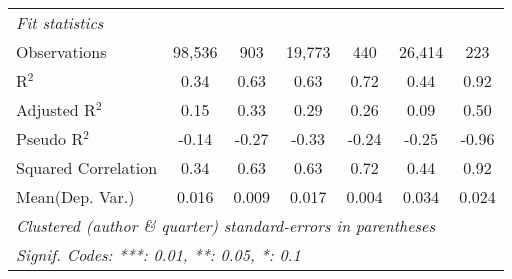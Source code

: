 \begin{tabular}{lcccccc}
   \midrule
   \emph{Fit statistics}\\
   Observations                                               & 98,536       & 903          & 19,773  & 440           & 26,414  & 223\\  
   R$^2$                                                      & 0.34         & 0.63         & 0.63    & 0.72          & 0.44    & 0.92\\  
   Adjusted R$^2$                                             & 0.15         & 0.33         & 0.29    & 0.26          & 0.09    & 0.50\\  
   Pseudo R$^2$                                               & -0.14        & -0.27        & -0.33   & -0.24         & -0.25   & -0.96\\  
   Squared Correlation                                        & 0.34         & 0.63         & 0.63    & 0.72          & 0.44    & 0.92\\  
Mean(Dep. Var.) & 0.016 & 0.009 & 0.017 & 0.004 & 0.034 & 0.024 \\
   \midrule \midrule
   \multicolumn{7}{l}{\emph{Clustered (author \& quarter) standard-errors in parentheses}}\\
   \multicolumn{7}{l}{\emph{Signif. Codes: ***: 0.01, **: 0.05, *: 0.1}}\\
\end{tabular}
\par\endgroup
